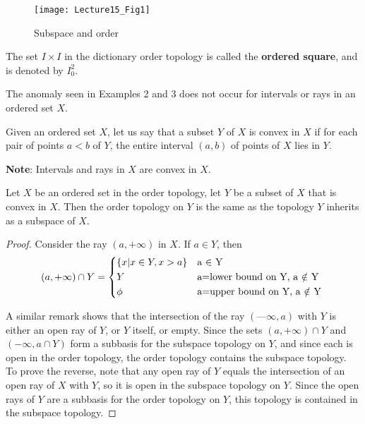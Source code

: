 \documentclass[a4paper,english,12pt]{article}
\begin{document}
\begin{figure}
	\centering
	\texttt{[image: Lecture15\_Fig1]}
	\caption{Subspace and order}
	\label{fig1}
\end{figure}

\begin{defn}
	The set $I \times I$ in the dictionary order topology is called the \textbf{ordered square}, and is denoted by $I_0^2$.
\end{defn}

The anomaly seen in Examples 2 and 3 does not occur for intervals or rays in an ordered set $X$.
\begin{defn}
	Given an ordered set $X$, let us say that a subset $Y$ of $X$ is convex in $X$ if for each pair of points $a < b$ of $Y$, the entire interval $(a,b)$ of points of $X$ lies in $Y$. 
\end{defn}
\textbf{Note}: Intervals and rays in $X$ are convex in $X$.

\begin{thm}
	Let $X$ be an ordered set in the order topology, let $Y$ be a subset
	of $X$ that is convex in $X$. Then the order topology on $Y$ is the same as the topology $Y$	inherits as a subspace of $X$.
\end{thm}

\begin{proof}
	Consider the ray $(a, +\infty)$ in $X$. If $a \in Y$, then
	\[(a, +\infty) \cap Y = 
		\begin{dcases*}
			\{x | x \in Y , x > a\} & a $\in$ Y\\
			Y & a=lower bound on Y, a $\notin$ Y\\
			\phi  & a=upper bound on Y, a $\notin$ Y
		\end{dcases*}
	\]
	
		A similar remark shows that the intersection of the ray $(—\infty, a)$ with $Y$ is either	an open ray of $Y$, or $Y$ itself, or empty. Since the sets $(a, +\infty) \cap Y$ and $(-\infty,a \cap Y)$ form a subbasis for the subspace topology on $Y$, and since each is open in the order topology, the order topology contains the subspace topology.\\
		To prove the reverse, note that any open ray of $Y$ equals the intersection of an open ray of $X$ with $Y$, so it is open in the subspace topology on $Y$. Since the open rays of $Y$ are a subbasis for the order topology on $Y$, this topology is contained in the subspace topology.
\end{proof}
\end{document}

